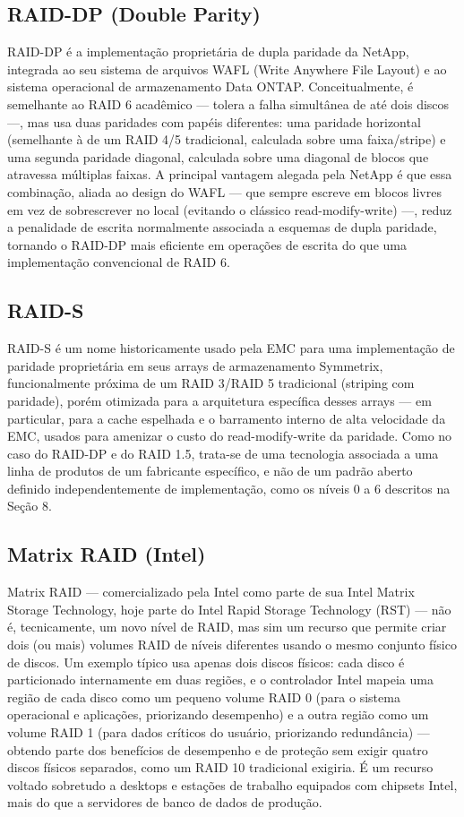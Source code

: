 \documentclass[11pt,a4paper]{article}
\begin{document}
\subsection{RAID-DP (Double Parity)}
RAID-DP é a implementação proprietária de dupla paridade da NetApp, integrada ao seu sistema de arquivos WAFL (Write Anywhere File Layout) e ao sistema operacional de armazenamento Data ONTAP. Conceitualmente, é semelhante ao RAID 6 acadêmico --- tolera a falha simultânea de até dois discos ---, mas usa duas paridades com papéis diferentes: uma paridade horizontal (semelhante à de um RAID 4/5 tradicional, calculada sobre uma faixa/stripe) e uma segunda paridade diagonal, calculada sobre uma diagonal de blocos que atravessa múltiplas faixas. A principal vantagem alegada pela NetApp é que essa combinação, aliada ao design do WAFL --- que sempre escreve em blocos livres em vez de sobrescrever no local (evitando o clássico read-modify-write) ---, reduz a penalidade de escrita normalmente associada a esquemas de dupla paridade, tornando o RAID-DP mais eficiente em operações de escrita do que uma implementação convencional de RAID 6.

\subsection{RAID-S}
RAID-S é um nome historicamente usado pela EMC para uma implementação de paridade proprietária em seus arrays de armazenamento Symmetrix, funcionalmente próxima de um RAID 3/RAID 5 tradicional (striping com paridade), porém otimizada para a arquitetura específica desses arrays --- em particular, para a cache espelhada e o barramento interno de alta velocidade da EMC, usados para amenizar o custo do read-modify-write da paridade. Como no caso do RAID-DP e do RAID 1.5, trata-se de uma tecnologia associada a uma linha de produtos de um fabricante específico, e não de um padrão aberto definido independentemente de implementação, como os níveis 0 a 6 descritos na Seção 8.

\subsection{Matrix RAID (Intel)}
Matrix RAID --- comercializado pela Intel como parte de sua Intel Matrix Storage Technology, hoje parte do Intel Rapid Storage Technology (RST) --- não é, tecnicamente, um novo nível de RAID, mas sim um recurso que permite criar dois (ou mais) volumes RAID de níveis diferentes usando o mesmo conjunto físico de discos. Um exemplo típico usa apenas dois discos físicos: cada disco é particionado internamente em duas regiões, e o controlador Intel mapeia uma região de cada disco como um pequeno volume RAID 0 (para o sistema operacional e aplicações, priorizando desempenho) e a outra região como um volume RAID 1 (para dados críticos do usuário, priorizando redundância) --- obtendo parte dos benefícios de desempenho e de proteção sem exigir quatro discos físicos separados, como um RAID 10 tradicional exigiria. É um recurso voltado sobretudo a desktops e estações de trabalho equipados com chipsets Intel, mais do que a servidores de banco de dados de produção.
\end{document}
